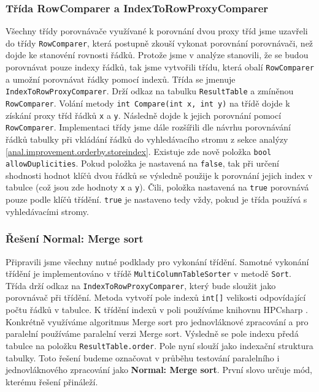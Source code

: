 \subsubsection{Třída RowComparer a IndexToRowProxyComparer}

Všechny třídy porovnávače využívané k porovnání dvou proxy tříd jsme uzavřeli do třídy \texttt{RowComparer}, která postupně zkouší vykonat porovnání porovnávači, než dojde ke stanovéní rovnosti řádků.
Protože jsme v analýze stanovili, že se budou porovnávat pouze indexy řádků, tak jsme vytvořili třídu, která obalí \texttt{RowComparer} a umožní porovnávat řádky pomocí indexů. 
Třída se jmenuje \texttt{IndexToRowProxyComparer}.
Drží odkaz na tabulku \texttt{ResultTable} a zmíněnou \texttt{RowComparer}.
Volání metody \texttt{int Compare(int x, int y)} na třídě dojde k získání proxy tříd řádků \texttt{x} a \texttt{y}.
Následně dojde k jejich porovnání pomocí \texttt{RowComparer}.
Implementaci třídy jsme dále rozšířili dle návrhu porovnávání řádků tabulky při vkládání řádků do vyhledávacího stromu z sekce analýzy \ref{anal.improvement.orderby.storeindex}.
Existuje zde nově položka \texttt{bool allowDuplicities}.
Pokud položka je nastavená na \texttt{false}, tak při určení shodnosti hodnot klíčů dvou řádků se výsledně použije k porovnání jejich index v tabulce (což jsou zde hodnoty \texttt{x} a \texttt{y}).
Čili, položka nastavená na \texttt{true} porovnává pouze podle klíčů třídění.
\texttt{true} je nastaveno tedy vždy, pokud je třída používá s vyhledávacími stromy. 

\subsubsection{Řešení Normal: Merge sort}

Připravili jsme všechny nutné podklady pro vykonání třídění.
Samotné vykonání třídění je implementováno v třídě \texttt{MultiColumnTableSorter} v metodě \texttt{Sort}.
Třída drží odkaz na \texttt{IndexToRowProxyComparer}, který bude sloužit jako porovnávač při třídění.
Metoda vytvoří pole indexů \texttt{int[]} velikosti odpovídající počtu řádků v tabulce.
K třídění indexů v poli používáme knihovnu HPCsharp \citep{hpcsharp}.
Konkrétně využíváme algoritmus Merge sort pro jednovláknové zpracování a pro paralelní používáme paralelní verzi Merge sort.
Výsledně se pole indexu předá tabulce na položku \texttt{ResultTable.order}.
Pole nyní slouží jako indexační struktura tabulky.
Toto řešení budeme označovat v průběhu testování paralelního i jednovláknového zpracování jako \textbf{Normal: Merge sort}.
První slovo určuje mód, kterému řešení přináleží.

